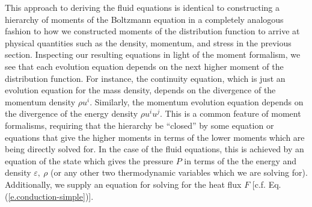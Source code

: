 This approach to deriving the fluid equations is identical to constructing a hierarchy of moments of the Boltzmann equation in a completely analogous fashion to how we constructed moments of the distribution function to arrive at physical quantities such as the density, momentum, and stress in the previous section.
Inspecting our resulting equations in light of the moment formalism, we see that each evolution equation depends on the next higher moment of the distribution function.
For instance, the continuity equation, which is just an evolution equation for the mass density, depends on the divergence of the momentum density $\rho u^i$.
Similarly, the momentum evolution equation depends on the divergence of the energy density $\rho u^i u^j$.
This is a common feature of moment formalisms, requiring that the hierarchy be ``closed'' by some equation or equations that give the higher moments in terms of the lower moments which are being directly solved for.
In the case of the fluid equations, this is achieved by an equation of the state which gives the pressure $P$ in terms of the the energy and density $\varepsilon,\ \rho$ (or any other two thermodynamic variables which we are solving for).
Additionally, we supply an equation for solving for the heat flux $F$ [c.f. Eq. (\ref{e.conduction-simple})].

